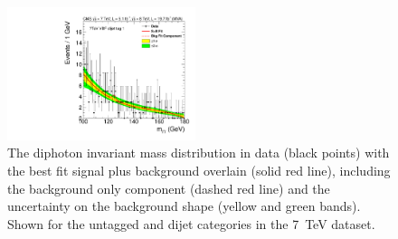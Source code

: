 \begin{figure}
  \includegraphics[width=0.49\textwidth]{results/plots/mgg-cats/mgg_mva_nosub_ch1_cat5_7TeV.pdf}
  \caption[The diphoton invariant mass distribution in data with the best fit signal plus background overlain for the untagged and dijet tagged categories in the 8~TeV dataset.]{The diphoton invariant mass distribution in data (black points) with the best fit signal plus background overlain (solid red line), including the background only component (dashed red line) and the uncertainty on the background shape (yellow and green bands). Shown for the untagged and dijet categories in the 7~TeV dataset.}
  \label{fig:bfres1}
\end{figure}

